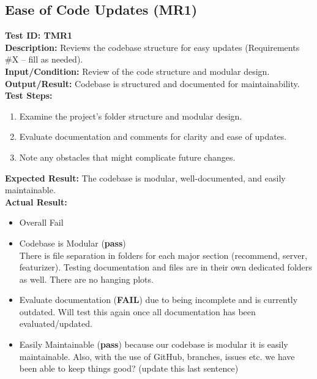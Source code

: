 \documentclass[12pt, titlepage]{article}
\begin{document}
\subsection{Ease of Code Updates (MR1)}
\textbf{Test ID: TMR1}\\
\textbf{Description:} Reviews the codebase structure for easy updates (Requirements \#X -- fill as needed).\\
\textbf{Input/Condition:} Review of the code structure and modular design.\\
\textbf{Output/Result:} Codebase is structured and documented for maintainability.\\
\textbf{Test Steps:}
\begin{enumerate}
    \item Examine the project's folder structure and modular design.
    \item Evaluate documentation and comments for clarity and ease of updates.
    \item Note any obstacles that might complicate future changes.
\end{enumerate}
\textbf{Expected Result:} The codebase is modular, well-documented, and easily maintainable.\\
\textbf{Actual Result:}
\begin{itemize}
    \item Overall Fail
    \item Codebase is Modular (\textbf{pass}) \\
          There is file separation in folders for each major section (recommend, server, featurizer). Testing documentation and files are in their own dedicated folders as well. There are no hanging plots.
    \item Evaluate documentation (\textbf{FAIL}) due to being incomplete and is currently outdated. Will test this again once all documentation has been evaluated/updated.
    \item Easily Maintainable (\textbf{pass}) because our codebase is modular it is easily maintainable. Also, with the use of GitHub, branches, issues etc. we have been able to keep things good? (update this last sentence)
\end{itemize}
\end{document}
